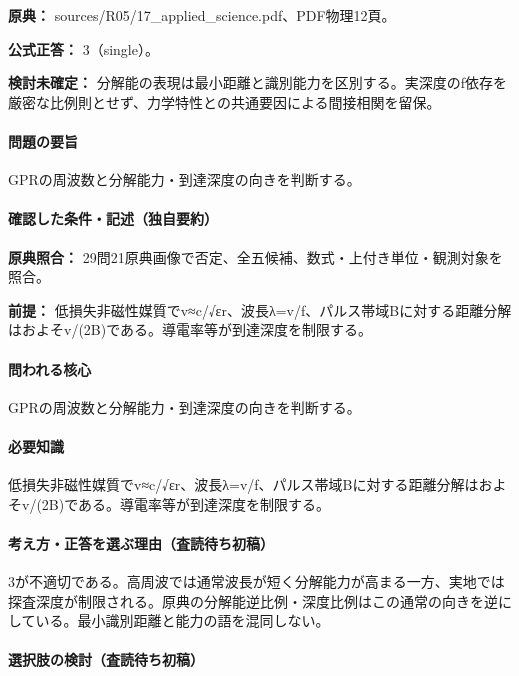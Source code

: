 \noindent\textbf{原典：} sources/R05/17\_applied\_science.pdf、PDF物理12頁。

\textbf{公式正答：} 3（single）。

\par\textbf{検討未確定：} 分解能の表現は最小距離と識別能力を区別する。実深度のf依存を厳密な比例則とせず、力学特性との共通要因による間接相関を留保。

\paragraph{問題の要旨} GPRの周波数と分解能力・到達深度の向きを判断する。

\paragraph{確認した条件・記述（独自要約）}\mbox{}\par

\noindent\textbf{原典照合：} 29問21原典画像で否定、全五候補、数式・上付き単位・観測対象を照合。\par

\noindent\textbf{前提：} 低損失非磁性媒質でv≈c/√εr、波長λ=v/f、パルス帯域Bに対する距離分解はおよそv/(2B)である。導電率等が到達深度を制限する。\par

\paragraph{問われる核心} GPRの周波数と分解能力・到達深度の向きを判断する。

\paragraph{必要知識} 低損失非磁性媒質でv≈c/√εr、波長λ=v/f、パルス帯域Bに対する距離分解はおよそv/(2B)である。導電率等が到達深度を制限する。

\paragraph{考え方・正答を選ぶ理由（査読待ち初稿）} 3が不適切である。高周波では通常波長が短く分解能力が高まる一方、実地では探査深度が制限される。原典の分解能逆比例・深度比例はこの通常の向きを逆にしている。最小識別距離と能力の語を混同しない。

\paragraph{選択肢の検討（査読待ち初稿）}\mbox{}\par

